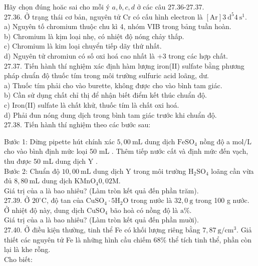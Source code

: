 \documentclass[10pt]{article}
\begin{document}
Hãy chọn đúng hoăc sai cho mỗi ý $a, b, c, d$ ở các câu 27.36-27.37.\\
27.36. Ở trạng thái cơ bản, nguyên tử Cr có cấu hình electron là $[\mathrm{Ar}] 3 \mathrm{~d}^{5} 4 \mathrm{~s}^{1}$.\\
a) Nguyên tố chromium thuộc chu kì 4, nhóm VIB trong bảng tuần hoàn.\\
b) Chromium là kịm loại nhẹ, có nhiệt độ nóng chảy thấp.\\
c) Chromium là kim loại chuyển tiếp dãy thứ nhất.\\
d) Nguyên tử chromiun có số oxi hoá cao nhất là +3 trong các hợp chất.\\
27.37. Tiến hành thí nghiệm xác định hàm lượng iron(II) sulfate bằng phương pháp chuẩn độ thuốc tím trong môi trường sulfuric acid loãng, dư.\\
a) Thuốc tím phải cho vào burette, không được cho vào bình tam giác.\\
b) Cần sử dụng chất chỉ thị để nhận biết điểm kết thúc chuẩn độ.\\
c) Iron(II) sulfate là chất khử, thuốc tím là chất oxi hoá.\\
d) Phải đun nóng dung dịch trong bình tam giác trước khi chuẩn độ.\\
27.38. Tiến hành thí nghiệm theo các bước sau:

Bước 1: Dừng pipette hút chính xác $5,00 \mathrm{~mL}$ dung dịch $\mathrm{FeSO}_{4}$ nồng độ a $\mathrm{mol} / \mathrm{L}$ cho vào bình định mức loại 50 mL . Thêm tiếp nước cất và định mức đến vạch, thu được 50 mL dung dịch Y .\\
Bước 2: Chuẩn độ $10,00 \mathrm{~mL}$ dung dịch Y trong môi trường $\mathrm{H}_{2} \mathrm{SO}_{4}$ loãng cần vừa đủ $8,80 \mathrm{~mL}$ dung dịch $\mathrm{KMnO}_{4} 0,02 \mathrm{M}$.\\
Giá trị của a là bao nhiêu? (Làm tròn kết quả đến phần trăm).\\
27.39. Ở $20^{\circ} \mathrm{C}$, độ tan của $\mathrm{CuSO}_{4} \cdot 5 \mathrm{H}_{2} \mathrm{O}$ trong nước là $32,0 \mathrm{~g}$ trong 100 g nước. Ở nhiệt độ này, dung dịch $\mathrm{CuSO}_{4}$ bão hoà có nồng độ là $\mathrm{a} \%$.\\
Giá trị của a là bao nhiêu? (Làm tròn kết quả đến phần muời).\\
27.40. Ở điều kiện thường, tinh thể Fe có khối lượng riêng bằng $7,87 \mathrm{~g} / \mathrm{cm}^{3}$. Giả thiết các nguyên tử Fe là những hình cầu chiếm $68 \%$ thể tích tinh thể, phần còn lại là khe rỗng.\\
Cho biết:
\end{document}
